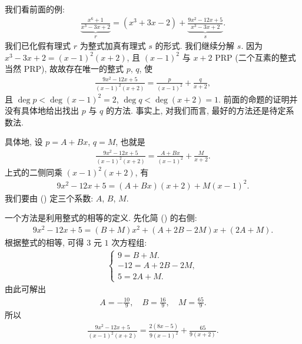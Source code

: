 \begin{example}
    我们看前面的例:
    \begin{align*}
        \underbrace{\frac{x^6 + 1}{x^3 - 3x + 2}}_{r} = (x^3 + 3x - 2) + \underbrace{\frac{9x^2 - 12x + 5}{x^3 - 3x + 2}}_{s}.
    \end{align*}
    我们已化假有理式 $r$ 为整式加真有理式 $s$ 的形式. 我们继续分解 $s$. 因为 $x^3 - 3x + 2 = (x - 1)^2 (x + 2)$, 且 $(x - 1)^2$ 与 $x + 2$ PRP (二个互素的整式当然 PRP), 故故存在唯一的整式 $p$, $q$, 使
    \begin{align*}
        \frac{9x^2 - 12x + 5}{(x - 1)^2 (x + 2)} = \frac{p}{(x - 1)^2} + \frac{q}{x + 2},
    \end{align*}
    且 $\deg p < \deg {(x - 1)^2} = 2$, $\deg q < \deg {(x + 2)} = 1$. 前面的命题的证明并没有具体地给出找出 $p$ 与 $q$ 的方法. 事实上, 对我们而言, 最好的方法还是待定系数法.

    具体地, 设 $p = A + Bx$, $q = M$, 也就是
    \begin{align*}
        \frac{9x^2 - 12x + 5}{(x - 1)^2 (x + 2)} = \frac{A + Bx}{(x - 1)^2} + \frac{M}{x + 2}.
    \end{align*}
    上式的二侧同乘 $(x - 1)^2 (x + 2)$, 有
    \begin{align*}
        9x^2 - 12x + 5 = (A + Bx) (x + 2) + M (x - 1)^2. \tag*{(\myStar)}
    \end{align*}
    我们要由 (\myStar) 定三个系数: $A$, $B$, $M$.

    一个方法是利用整式的相等的定义. 先化简 (\myStar) 的右侧:
    \begin{align*}
        9x^2 - 12x + 5 = (B + M) x^2 + (A + 2B - 2M) x + (2A + M).
    \end{align*}
    根据整式的相等, 可得 $3$ 元 $1$ 次方程组:
    \begin{align*}
        \begin{cases}
            9 = B + M.         \\
            -12 = A + 2B - 2M, \\
            5 = 2A + M.
        \end{cases}
    \end{align*}
    由此可解出
    \begin{align*}
        A = -\frac{10}{9}, \quad B = \frac{16}{9}, \quad M = \frac{65}{9}.
    \end{align*}
    所以
    \begin{align*}
        \frac{9x^2 - 12x + 5}{(x - 1)^2 (x + 2)} = \frac{2(8x - 5)}{9(x - 1)^2} + \frac{65}{9(x + 2)}.
    \end{align*}


\end{example}
